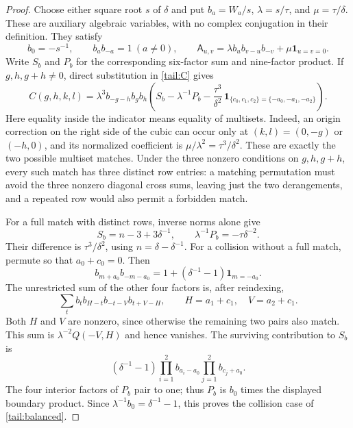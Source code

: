 \documentclass[11pt]{article}
\numberwithin{equation}{section}
\theoremstyle{definition}
\theoremstyle{remark}
\begin{document}
\begin{proof}
Choose either square root $s$ of $\delta$ and put
$b_a=W_a/s$, $\lambda=s/\tau$, and $\mu=\tau/\delta$.
These are auxiliary algebraic variables, with no complex conjugation
in their definition.  They satisfy
\[
 b_0=-s^{-1},\qquad b_ab_{-a}=1\ (a\ne0),\qquad
 \mathsf A_{u,v}=\lambda b_ub_{v-u}b_{-v}
                                  +\mu\mathbf1_{u=v=0}.
\]
Write $S_b$ and $P_b$ for the corresponding six-factor sum and
nine-factor product.  If $g,h,g+h\ne0$, direct substitution
in \eqref{tail:C} gives
\begin{equation}\label{tail:balanced}
 C(g,h,k,l)=\lambda^3b_{-g-h}b_gb_h
 \left(S_b-\lambda^{-1}P_b
       -\frac{\tau^3}{\delta^2}\,
        \mathbf1_{\{c_0,c_1,c_2\}=\{-a_0,-a_1,-a_2\}}\right).
\end{equation}
Here equality inside the indicator means equality of multisets.
Indeed, an origin correction on the right side of the cubic can
occur only at $(k,l)=(0,-g)$ or $(-h,0)$, and its normalized
coefficient is $\mu/\lambda^2=\tau^3/\delta^2$.  These are
exactly the two possible multiset matches.  Under the three
nonzero conditions on $g,h,g+h$, every such match has three
distinct row entries: a matching permutation must avoid the
three nonzero diagonal cross sums, leaving just the two
derangements, and a repeated row would also permit a forbidden match.

For a full match with distinct rows, inverse norms alone give
\[
 S_b=n-3+3\delta^{-1},\qquad
 \lambda^{-1}P_b=-\tau\delta^{-2}.
\]
Their difference is $\tau^3/\delta^2$, using
$n=\delta-\delta^{-1}$.  For a collision without a full match,
permute so that $a_0+c_0=0$.  Then
\[
 b_{m+a_0}b_{-m-a_0}
    =1+(\delta^{-1}-1)\mathbf1_{m=-a_0}.
\]
The unrestricted sum of the other four factors is, after
reindexing,
\[
 \sum_t b_tb_{H-t}b_{-t-V}b_{t+V-H},
 \qquad H=a_1+c_1,\quad V=a_2+c_1.
\]
Both $H$ and $V$ are nonzero, since otherwise the remaining
two pairs also match.  This sum is
$\lambda^{-2}Q(-V,H)$ and hence vanishes.
The surviving contribution to $S_b$ is
\[
 (\delta^{-1}-1)
       \prod_{i=1}^2b_{a_i-a_0}\prod_{j=1}^2b_{c_j+a_0}.
\]
The four interior factors of $P_b$ pair to one; thus $P_b$ is
$b_0$ times the displayed boundary product.  Since
$\lambda^{-1}b_0=\delta^{-1}-1$, this proves the collision
case of \eqref{tail:balanced}.


\end{proof}
\end{document}
